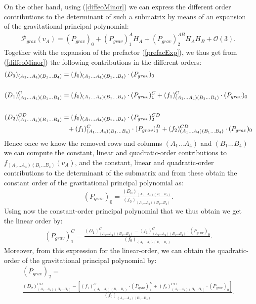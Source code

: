 On the other hand, using (\ref{diffeoMinor}) we can express the different order contributions to the determinant of such a submatrix by means of an expansion of the gravitational principal polynomial:
\begin{align}
    \mathcal{P}_{grav}(v_A) = (P_{grav})_{0} + (P_{grav})^A_1 H_A+ (P_{grav})^{AB}_2 H_A H_B +\mathcal{O}(3).
\end{align}
Together with the expansion of the prefactor (\ref{prefacExp}), we thus get from (\ref{diffeoMinor}) the following contributions in the different orders:
\begin{align}\label{minorPoly}
    \begin{aligned}
    (D_0)_{(A_1...A_4)(B_1...B_4)}  &= (f_0)_{(A_1...A_4)(B_1...B_4)} \cdot (P_{grav})_0 \\
    \\
    (D_1)^C_{(A_1...A_4)(B_1...B_4)}  &= (f_0)_{(A_1...A_4)(B_1...B_4)} \cdot (P_{grav})^C_1 + (f_1)^C_{(A_1...A_4)(B_1...B_4)} \cdot (P_{grav})_0  \\
    \\
    (D_2)^{CD}_{(A_1...A_4)(B_1...B_4)}  &=  (f_0)_{(A_1...A_4)(B_1...B_4)} \cdot (P_{grav})_2^{CD} \\
     & \hphantom{=} +
     (f_1)^C_{(A_1...A_4)(B_1...B_4)} \cdot (P_{grav})_1^D +(f_2)^{CD}_{(A_1...A_4)(B_1...B_4)} \cdot (P_{grav})_0 
    \end{aligned}
\end{align}
Hence once we know the removed rows and columns $(A_1...A_4)$ and $(B_1...B_4)$ we can compute the constant, linear and quadratic-order contributions to $f_{(A_1...A_4)(B_1...B_4)}(v_A)$, and the constant, linear and quadratic-order contributions to the determinant of the submatrix and from these obtain the constant order of the gravitational principal polynomial as:
\begin{align}\label{POLY1}
(P_{grav})_0 = \frac{(D_0)_{(A_1...A_4)(B_1...B_4)}}{(f_0)_{(A_1...A_4)(B_1...B_4)}}.
\end{align}
Using now the constant-order principal polynomial that we thus obtain we get the linear order by:
\begin{align}\label{POLY2}
    (P_{grav})^C_1= \frac{(D_1)^C_{(A_1...A_4)(B_1...B_4)} - (f_1)^C_{(A_1...A_4)(B_1...B_4)} \cdot (P_{grav})_0}{(f_0)_{(A_1...A_4)(B_1...B_4)}}.
\end{align}
Moreover, from this expression for the linear-order, we can obtain the quadratic-order of the gravitational principal polynomial by:
\begin{multline}\label{POLY3}
    (P_{grav})_2 = \\
    \frac{(D_2)^{CD}_{(A_1...A_4)(B_1...B_4)}-\left [ (f_1)^C_{(A_1...A_4)(B_1...B_4)} \cdot (P_{grav})^D_1  +(f_2)^{CD}_{(A_1...A_4)(B_1...B_4)} \cdot (P_{grav})_0 \right ]}{(f_0)_{(A_1...A_4)(B_1...B_4)}}.
\end{multline}

